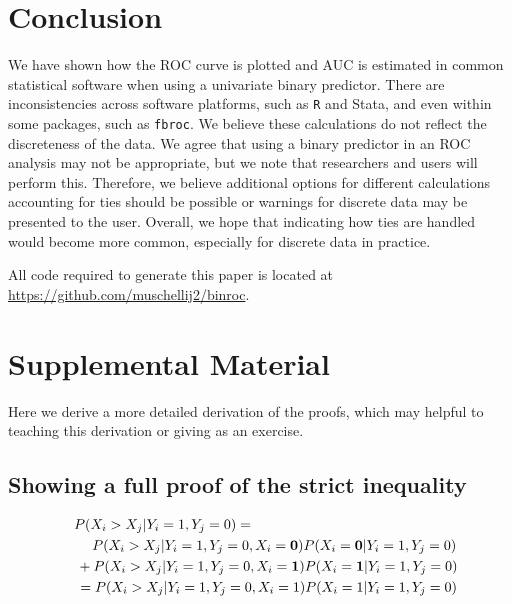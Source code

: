 \documentclass[article]{jss}
\begin{document}
\hypertarget{conclusion}{%
\section{Conclusion}\label{conclusion}}

We have shown how the ROC curve is plotted and AUC is estimated in
common statistical software when using a univariate binary predictor.
There are inconsistencies across software platforms, such as \texttt{R}
and Stata, and even within some packages, such as \texttt{fbroc}. We
believe these calculations do not reflect the discreteness of the data.
We agree that using a binary predictor in an ROC analysis may not be
appropriate, but we note that researchers and users will perform this.
Therefore, we believe additional options for different calculations
accounting for ties should be possible or warnings for discrete data may
be presented to the user. Overall, we hope that indicating how ties are
handled would become more common, especially for discrete data in
practice.

All code required to generate this paper is located at
\url{https://github.com/muschellij2/binroc}.

\hypertarget{supplemental-material}{%
\section{Supplemental Material}\label{supplemental-material}}

Here we derive a more detailed derivation of the proofs, which may
helpful to teaching this derivation or giving as an exercise.

\hypertarget{showing-a-full-proof-of-the-strict-inequality}{%
\subsection{Showing a full proof of the strict
inequality}\label{showing-a-full-proof-of-the-strict-inequality}}

\begin{align}
& P(X_{i} > X_{j} | Y_{i} = 1, Y_{j} = 0) = \;\;\;\; \nonumber \\ 
\;\;\; & \hspace{1.3em}P(X_{i} > X_{j} | Y_{i} = 1, Y_{j} = 0, X_{i} = {\bf 0}) P(X_{i} = {\bf 0} | Y_{i} = 1, Y_{j} = 0) \nonumber \\
\;\;\; &\,+ P(X_{i} > X_{j} | Y_{i} = 1, Y_{j} = 0, X_{i} = {\bf 1}) P(X_{i} = {\bf 1} | Y_{i} = 1, Y_{j} = 0) \nonumber \\
\;\;\; &\,= P(X_{i} > X_{j} | Y_{i} = 1, Y_{j} = 0, X_{i} = 1) P(X_{i} = 1 | Y_{i} = 1, Y_{j} = 0) \label{eq:expand_supp}
\end{align}
\end{document}

